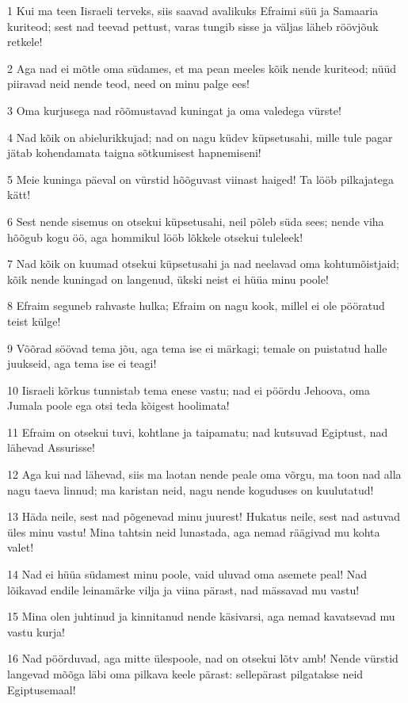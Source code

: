 \par 1 Kui ma teen Iisraeli terveks, siis saavad avalikuks Efraimi süü ja Samaaria kuriteod; sest nad teevad pettust, varas tungib sisse ja väljas läheb röövjõuk retkele!
\par 2 Aga nad ei mõtle oma südames, et ma pean meeles kõik nende kuriteod; nüüd piiravad neid nende teod, need on minu palge ees!
\par 3 Oma kurjusega nad rõõmustavad kuningat ja oma valedega vürste!
\par 4 Nad kõik on abielurikkujad; nad on nagu küdev küpsetusahi, mille tule pagar jätab kohendamata taigna sõtkumisest hapnemiseni!
\par 5 Meie kuninga päeval on vürstid hõõguvast viinast haiged! Ta lööb pilkajatega kätt!
\par 6 Sest nende sisemus on otsekui küpsetusahi, neil põleb süda sees; nende viha hõõgub kogu öö, aga hommikul lööb lõkkele otsekui tuleleek!
\par 7 Nad kõik on kuumad otsekui küpsetusahi ja nad neelavad oma kohtumõistjaid; kõik nende kuningad on langenud, ükski neist ei hüüa minu poole!
\par 8 Efraim seguneb rahvaste hulka; Efraim on nagu kook, millel ei ole pööratud teist külge!
\par 9 Võõrad söövad tema jõu, aga tema ise ei märkagi; temale on puistatud halle juukseid, aga tema ise ei teagi!
\par 10 Iisraeli kõrkus tunnistab tema enese vastu; nad ei pöördu Jehoova, oma Jumala poole ega otsi teda kõigest hoolimata!
\par 11 Efraim on otsekui tuvi, kohtlane ja taipamatu; nad kutsuvad Egiptust, nad lähevad Assurisse!
\par 12 Aga kui nad lähevad, siis ma laotan nende peale oma võrgu, ma toon nad alla nagu taeva linnud; ma karistan neid, nagu nende koguduses on kuulutatud!
\par 13 Häda neile, sest nad põgenevad minu juurest! Hukatus neile, sest nad astuvad üles minu vastu! Mina tahtsin neid lunastada, aga nemad räägivad mu kohta valet!
\par 14 Nad ei hüüa südamest minu poole, vaid uluvad oma asemete peal! Nad lõikavad endile leinamärke vilja ja viina pärast, nad mässavad mu vastu!
\par 15 Mina olen juhtinud ja kinnitanud nende käsivarsi, aga nemad kavatsevad mu vastu kurja!
\par 16 Nad pöörduvad, aga mitte ülespoole, nad on otsekui lõtv amb! Nende vürstid langevad mõõga läbi oma pilkava keele pärast: sellepärast pilgatakse neid Egiptusemaal!

